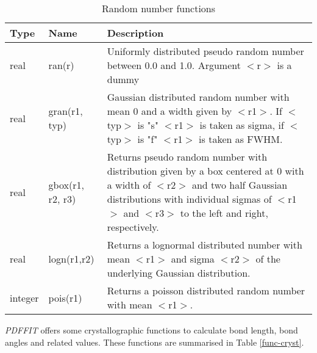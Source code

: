 \begin{table}[!tb]
\centering
\begin{tabularx}{\textwidth}{|p{15mm}|p{30mm}|X|}
  \hline
  {\bf Type} & {\bf Name} & {\bf Description} \\
  \hline\hline
  real & ran(r) &         Uniformly distributed pseudo random number
                          between 0.0 and 1.0. Argument $<$r$>$ is a
                          dummy\\
  \hline
  real & gran(r1, typ) &  Gaussian distributed random number with mean
                          0 and a width given by $<$r1$>$. If $<$typ$>$
                          is "s" $<$r1$>$ is taken as sigma, if
                          $<$typ$>$ is "f" $<$r1$>$ is taken as
                          FWHM. \\
  \hline
  real & gbox(r1, r2, r3) & Returns pseudo random number with
                          distribution given by a box centered
                          at 0 with a width of $<$r2$>$ and two half
                          Gaussian distributions with individual
                          sigmas of $<$r1$>$ and $<$r3$>$ to the left
                          and right, respectively. \\
  real & logn(r1,r2)      & Returns a lognormal distributed number
                          with mean $<$r1$>$ and sigma $<$r2$>$ of
                          the underlying
                          Gaussian distribution.\\
  integer & pois(r1)      & Returns a poisson distributed random
                          number with mean $<$r1$>$.\\
  \hline
\end{tabularx}
\caption{\label{func-ran}Random number functions}
\end{table}

{\it PDFFIT} offers some crystallographic functions to calculate
bond length, bond angles and related values. These functions are
summarised in Table \ref{func-cryst}.

